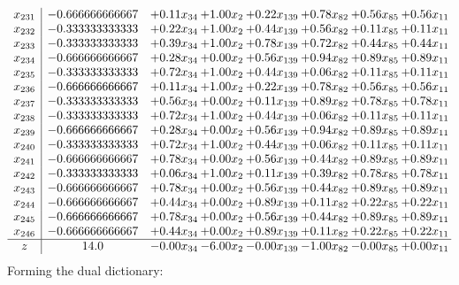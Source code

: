 \documentclass[8pt]{article}
\begin{document}
\[\begin{array}{c| c c@{\hskip 2pt} c@{\hskip 2pt} c@{\hskip 2pt} c@{\hskip 2pt} c@{\hskip 2pt} c@{\hskip 2pt} }
 x_{231}   &  -0.666666666667 & +  0.11 x_{34} & +  1.00 x_{2} & +  0.22 x_{139} & +  0.78 x_{82} & +  0.56 x_{85} & +  0.56 x_{11}\\
 x_{232}   &  -0.333333333333 & +  0.22 x_{34} & +  1.00 x_{2} & +  0.44 x_{139} & +  0.56 x_{82} & +  0.11 x_{85} & +  0.11 x_{11}\\
 x_{233}   &  -0.333333333333 & +  0.39 x_{34} & +  1.00 x_{2} & +  0.78 x_{139} & +  0.72 x_{82} & +  0.44 x_{85} & +  0.44 x_{11}\\
 x_{234}   &  -0.666666666667 & +  0.28 x_{34} & +  0.00 x_{2} & +  0.56 x_{139} & +  0.94 x_{82} & +  0.89 x_{85} & +  0.89 x_{11}\\
 x_{235}   &  -0.333333333333 & +  0.72 x_{34} & +  1.00 x_{2} & +  0.44 x_{139} & +  0.06 x_{82} & +  0.11 x_{85} & +  0.11 x_{11}\\
 x_{236}   &  -0.666666666667 & +  0.11 x_{34} & +  1.00 x_{2} & +  0.22 x_{139} & +  0.78 x_{82} & +  0.56 x_{85} & +  0.56 x_{11}\\
 x_{237}   &  -0.333333333333 & +  0.56 x_{34} & +  0.00 x_{2} & +  0.11 x_{139} & +  0.89 x_{82} & +  0.78 x_{85} & +  0.78 x_{11}\\
 x_{238}   &  -0.333333333333 & +  0.72 x_{34} & +  1.00 x_{2} & +  0.44 x_{139} & +  0.06 x_{82} & +  0.11 x_{85} & +  0.11 x_{11}\\
 x_{239}   &  -0.666666666667 & +  0.28 x_{34} & +  0.00 x_{2} & +  0.56 x_{139} & +  0.94 x_{82} & +  0.89 x_{85} & +  0.89 x_{11}\\
 x_{240}   &  -0.333333333333 & +  0.72 x_{34} & +  1.00 x_{2} & +  0.44 x_{139} & +  0.06 x_{82} & +  0.11 x_{85} & +  0.11 x_{11}\\
 x_{241}   &  -0.666666666667 & +  0.78 x_{34} & +  0.00 x_{2} & +  0.56 x_{139} & +  0.44 x_{82} & +  0.89 x_{85} & +  0.89 x_{11}\\
 x_{242}   &  -0.333333333333 & +  0.06 x_{34} & +  1.00 x_{2} & +  0.11 x_{139} & +  0.39 x_{82} & +  0.78 x_{85} & +  0.78 x_{11}\\
 x_{243}   &  -0.666666666667 & +  0.78 x_{34} & +  0.00 x_{2} & +  0.56 x_{139} & +  0.44 x_{82} & +  0.89 x_{85} & +  0.89 x_{11}\\
 x_{244}   &  -0.666666666667 & +  0.44 x_{34} & +  0.00 x_{2} & +  0.89 x_{139} & +  0.11 x_{82} & +  0.22 x_{85} & +  0.22 x_{11}\\
 x_{245}   &  -0.666666666667 & +  0.78 x_{34} & +  0.00 x_{2} & +  0.56 x_{139} & +  0.44 x_{82} & +  0.89 x_{85} & +  0.89 x_{11}\\
 x_{246}   &  -0.666666666667 & +  0.44 x_{34} & +  0.00 x_{2} & +  0.89 x_{139} & +  0.11 x_{82} & +  0.22 x_{85} & +  0.22 x_{11}\\
\hline
z    &  14.0 & -0.00 x_{34} & -6.00 x_{2} & -0.00 x_{139} & -1.00 x_{82} & -0.00 x_{85} & +  0.00 x_{11}\\
\end{array}\]
Forming the dual dictionary:
\end{document}
